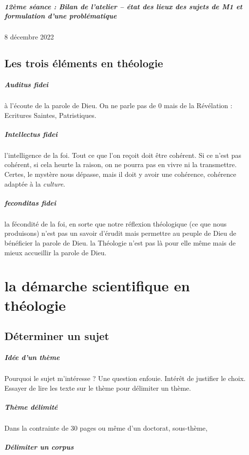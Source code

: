 \paragraph{12ème séance : Bilan de l’atelier – état des lieux des sujets de M1 et formulation d’une problématique}   8 décembre 2022




\section{Les trois éléments en théologie}

\paragraph{Auditus fidei} à l'écoute de la parole de Dieu. On ne parle pas de 0 mais de la Révélation : Ecritures Saintes, Patristiques. 

\paragraph{Intellectus fidei} l'intelligence de la foi. Tout ce que l'on reçoit doit être cohérent. Si ce n'est pas cohérent, si cela heurte la raison, on ne pourra pas en vivre ni la transmettre. Certes, le mystère nous dépasse, mais il doit y avoir une cohérence, cohérence adaptée à la \textit{culture}. 

\paragraph{feconditas fidei} la fécondité de la foi, en sorte que notre réflexion théologique (ce que nous produisons) n'est pas un savoir d'érudit mais permettre au peuple de Dieu de bénéficier la parole de Dieu. la Théologie n'est pas là pour elle même mais de mieux accueillir la parole de  Dieu. 


 \chapter{la démarche scientifique en théologie}


\section{Déterminer un sujet}

\paragraph{Idée d'un thème} Pourquoi le sujet m'intéresse ?  Une question enfouie. Intérêt de justifier le choix. Essayer de lire les texte sur le thème pour délimiter un thème.

\paragraph{Thème délimité} Dans la contrainte de 30 pages ou même d'un doctorat, sous-thème, 


\paragraph{Délimiter un corpus} 



 







